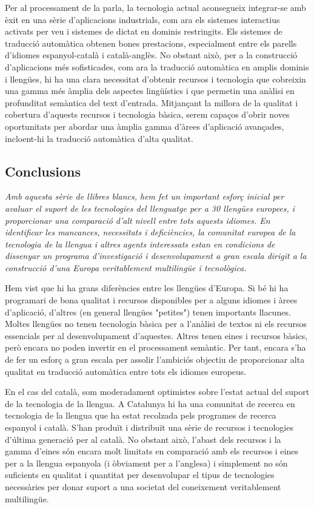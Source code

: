\documentclass[]{../../metanetpaper}
\begin{document}
\begin{multicols}{2}
Per al processament de la parla, la tecnologia actual aconsegueix integrar-se amb èxit en una sèrie d'aplicacions industrials, com ara els sistemes interactius activats per veu i sistemes de dictat en dominis restringits. Els sistemes de traducció automàtica obtenen bones prestacions, especialment entre els parells d'idiomes espanyol-català i català-anglès. No obstant això, per a la construcció d'aplicacions més sofisticades, com ara la traducció automàtica en amplis dominis i llengües, hi ha una clara necessitat d'obtenir recursos i tecnologia que cobreixin una gamma més àmplia dels aspectes lingüístics i que permetin una anàlisi en profunditat semàntica del text d'entrada. Mitjançant la millora de la qualitat i cobertura d'aquests recursos i tecnologia bàsica, serem capaços d'obrir noves oportunitats per abordar una àmplia gamma d'àrees d'aplicació avançades, incloent-hi la traducció automàtica d'alta qualitat.

\subsection{Conclusions}

\emph{Amb aquesta sèrie de llibres blancs, hem fet un important esforç inicial per avaluar el suport de les tecnologies del llenguatge per a 30 llengües europees, i proporcionar una comparació d'alt nivell entre tots aquests idiomes. En identificar les mancances, necessitats i deficiències, la comunitat europea de la tecnologia de la llengua i altres agents interessats estan en condicions de dissenyar un programa d’investigació i desenvolupament a gran escala dirigit a la construcció d'una Europa veritablement multilingüe i tecnològica.}

Hem vist que hi ha grans diferències entre les llengües d'Europa. Si bé hi ha programari de bona qualitat i recursos disponibles per a alguns idiomes i àrees d'aplicació, d’altres (en general llengües "petites") tenen importants llacunes. Moltes llengües no tenen tecnologia bàsica per a l'anàlisi de textos ni els recursos essencials per al desenvolupament d'aquestes. Altres tenen eines i recursos bàsics, però encara no poden invertir en el processament semàntic. Per tant, encara s'ha de fer un esforç a gran escala per assolir l'ambiciós objectiu de proporcionar alta qualitat en traducció automàtica entre tots els idiomes europeus.

En el cas del català, som moderadament optimistes sobre l'estat actual del suport de la tecnologia de la llengua. A Catalunya hi ha una comunitat de recerca en tecnologia de la llengua que ha estat recolzada pels programes de recerca espanyol i català. S’han produït i distribuït una sèrie de recursos i tecnologies d'última generació per al català. No obstant això, l'abast dels recursos i la gamma d'eines són encara molt limitats en comparació amb els recursos i eines per a la llengua espanyola (i òbviament per a l'anglesa) i simplement no són suficients en qualitat i quantitat per desenvolupar el tipus de tecnologies necessàries per donar suport a una societat del coneixement veritablement multilingüe.


\end{multicols}
\end{document}
